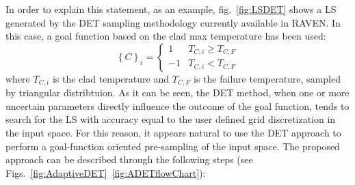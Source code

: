 In order to explain this statement, as an example, fig.~\ref{fig:LSDET} shows a LS generated by the DET sampling methodology currently available in RAVEN. In this case, a goal function based on the clad max temperature has been used:
\begin{equation}
\left \{ C \right \}_{i}=\left \{ \begin{matrix}
1 & T_{C,i}\geq T_{C,F}\\ 
-1 & T_{C,i}<  T_{C,F}
\end{matrix} \right.
\end{equation}
where $T_{C,i}$ is the clad temperature and $T_{C,F}$ is the failure temperature, sampled by triangular distribtuion.
As it can be seen, the DET method, when one or more uncertain parameters directly influence the outcome of the goal function, tends to search for the LS with accuracy equal to the user defined grid discretization in the input space. 
For this reason, it appears natural to use the DET approach to perform a goal-function oriented pre-sampling of the input space. The proposed approach can be described through the following steps (see Figs.~\ref{fig:AdaptiveDET}~\ref{fig:ADETflowChart}):

